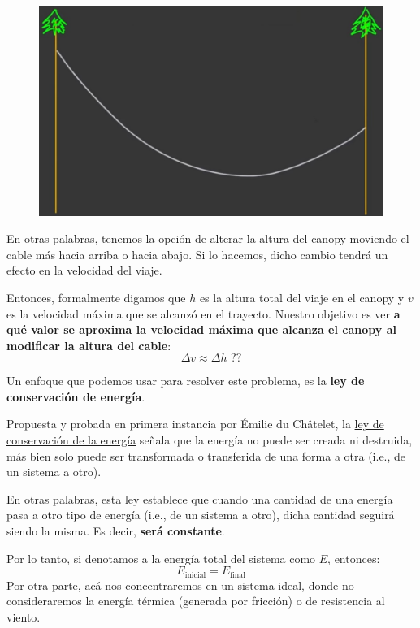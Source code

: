\documentclass[12pt]{article}
\begin{document}
\begin{figure}[hbt!]
\centering
\includegraphics[scale=0.3]{img/zipline_example.jpg}
\end{figure}

En otras palabras, tenemos la opción de alterar la altura del canopy moviendo el cable más hacia arriba o hacia abajo. Si lo hacemos, dicho cambio tendrá un efecto en la velocidad del viaje.

Entonces, formalmente digamos que $h$ es la altura total del viaje en el canopy y $v$ es la velocidad máxima que se alcanzó en el trayecto. Nuestro objetivo es ver \textbf{a qué valor se aproxima la velocidad máxima que alcanza el canopy al modificar la altura del cable}:
\[\Delta v \approx \Delta h \text{ ??}\]

Un enfoque que podemos usar para resolver este problema, es la \textbf{ley de conservación de energía}.

Propuesta y probada en primera instancia por Émilie du Châtelet, la \href{https://en.wikipedia.org/wiki/Conservation_of_energy}{ley de conservación de la energía} señala que la energía no puede ser creada ni destruida, más bien solo puede ser transformada o transferida de una forma a otra (i.e., de un sistema a otro).

En otras palabras, esta ley establece que cuando una cantidad de una energía pasa a otro tipo de energía (i.e., de un sistema a otro), dicha cantidad seguirá siendo la misma. Es decir, \textbf{será constante}.

Por lo tanto, si denotamos a la energía total del sistema como $E$, entonces:
\[E_{\text{inicial}} = E_{\text{final}}\]
Por otra parte, acá nos concentraremos en un sistema ideal, donde no consideraremos la energía térmica (generada por fricción) o de resistencia al viento.
\end{document}
